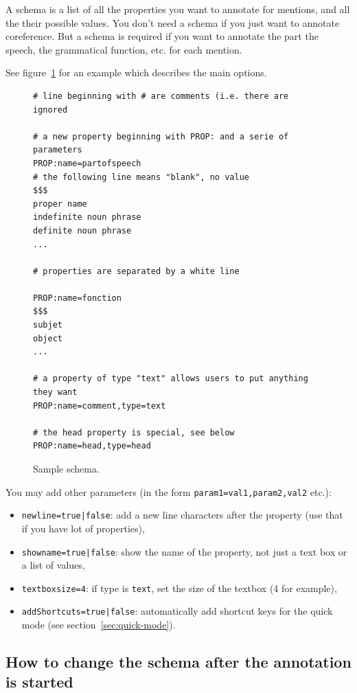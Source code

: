 \documentclass[12pt]{article}
\begin{document}
A schema is a list of all the properties you want to annotate for mentions,
and all the their possible values.  You don't need a schema if you just want
to annotate coreference.  But a schema is required if you want to annotate
the part the speech, the grammatical function, etc. for each mention.

See figure~\ref{fig-sacr-example-schema} for an example which describes the
main options.

\begin{figure}[tbp]
\begin{mdframed}
\begin{verbatim}
# line beginning with # are comments (i.e. there are ignored

# a new property beginning with PROP: and a serie of parameters
PROP:name=partofspeech
# the following line means "blank", no value
$$$
proper name
indefinite noun phrase
definite noun phrase
...

# properties are separated by a white line

PROP:name=fonction
$$$
subjet
object
...

# a property of type "text" allows users to put anything they want
PROP:name=comment,type=text

# the head property is special, see below
PROP:name=head,type=head
\end{verbatim}
\end{mdframed}
\caption{Sample schema.}\label{fig-sacr-example-schema}
\end{figure}

You may add other parameters (in the form \verb|param1=val1,param2,val2|
etc.):
\begin{itemize}
   \item \verb+newline=true|false+: add a new line characters after the
   property (use that if you have lot of properties),
   \item \verb+showname=true|false+: show the name of the property, not just
   a text box or a list of values,
   \item \verb+textboxsize=4+: if type is \verb|text|, set the size of the
   textbox (4 for example),
   \item \verb+addShortcuts=true|false+: automatically add shortcut keys for
   the quick mode (see section~\ref{sec:quick-mode}).
\end{itemize}

 \subsection{How to change the schema after the annotation is started}
\end{document}
